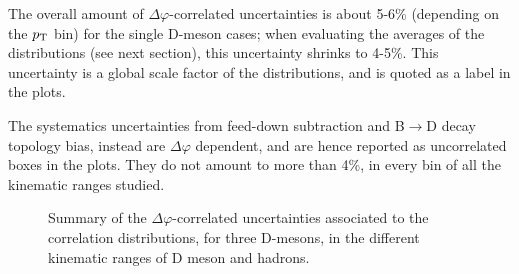 The overall amount of $\Delta\varphi$-correlated uncertainties is about 5-6\% (depending on the $p_{\rm T}$ bin) for the single D-meson cases; when evaluating the averages of the distributions (see next section), this uncertainty shrinks to 4-5\%. This uncertainty is a global scale factor of the distributions, and is quoted as a label in the plots.

The systematics uncertainties from feed-down subtraction and B$\rightarrow$D decay topology bias, instead are $\Delta\varphi$ dependent, and are hence reported as uncorrelated boxes in the plots.  They do not amount to more than 4\%, in every bin of all the kinematic ranges studied.
\begin{figure}[h]
\centering
{}
\caption{Summary of the $\Delta\varphi$-correlated uncertainties associated to the correlation distributions, for three D-mesons, in the different kinematic ranges of D meson and hadrons.}
\label{fig:SystOverall}
\end{figure}
